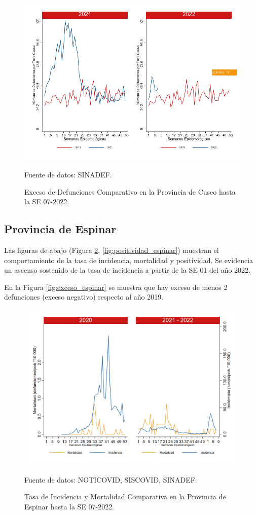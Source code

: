 \documentclass[12pt,a4paper,openany]{book}
\begin{document}
		\begin{figure}[h]
			\caption{Exceso de Defunciones Comparativo en la Provincia de Cusco hasta la SE 07-2022.}\label{fig:exceso_cusco}
			\begin{center}
				\includegraphics[width=0.7\linewidth]{../figuras/exceso_7.pdf}
			\end{center}
			{\footnotesize {Fuente de datos: SINADEF.}}
		\end{figure}
		
		\clearpage
		
		\subsection*{Provincia de Espinar}
		\noindent Las figuras de abajo (Figura \ref{fig:inc_mort_espinar}, \ref{fig:positividad_espinar}) muestran el comportamiento de la tasa de incidencia, mortalidad y positividad. Se evidencia un ascenso sostenido de la tasa de incidencia a partir de la SE 01 del año 2022.
		
		En la Figura \ref{fig:exceso_espinar} se muestra que hay exceso de menos 2 defunciones (exceso negativo) respecto al año 2019.
		
		\begin{figure}[h]
			\caption{Tasa de Incidencia y Mortalidad Comparativa en la Provincia de Espinar hasta la SE 07-2022.}\label{fig:inc_mort_espinar}
			\begin{center}
				\includegraphics[width=0.7\linewidth]{../figuras/incidencia_mortalidad_20_21_8.png}
			\end{center}
			{\footnotesize {Fuente de datos: NOTICOVID, SISCOVID, SINADEF.}}
		\end{figure}
		
\end{document}
